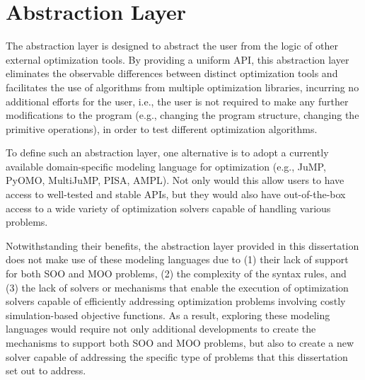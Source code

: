 

\section{Abstraction Layer}
The abstraction layer is designed to abstract the user from the logic of other external optimization tools. By providing a uniform \ac{API}, this abstraction layer eliminates the observable differences between distinct optimization tools and facilitates the use of algorithms from multiple optimization libraries, incurring no additional efforts for the user, i.e., the user is not required to make any further modifications to the program (e.g., changing the program structure, changing the primitive operations), in order to test different optimization algorithms. 

To define such an abstraction layer, one alternative is to adopt a currently available domain-specific modeling language for optimization (e.g., JuMP, PyOMO, MultiJuMP, PISA, AMPL). Not only would this allow users to have access to well-tested and stable \acp{API}, but they would also have out-of-the-box access to a wide variety of optimization solvers capable of handling various problems. 

Notwithstanding their benefits, the abstraction layer provided in this dissertation does not make use of these modeling languages due to (1) their lack of support for both \ac{SOO} and \ac{MOO} problems, (2) the complexity of the syntax rules, and (3) the lack of solvers or mechanisms that enable the execution of optimization solvers capable of efficiently addressing optimization problems involving costly simulation-based objective functions. As a result, exploring these modeling languages would require not only additional developments to create the mechanisms to support both \ac{SOO} and \ac{MOO} problems, but also to create a new solver capable of addressing the specific type of problems that this dissertation set out to address. 

